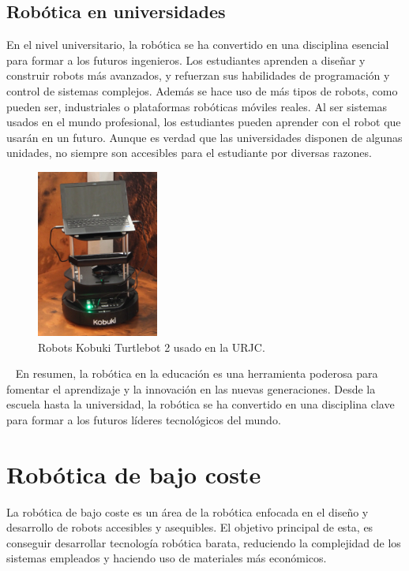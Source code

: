 \subsection{Robótica en universidades}
En el nivel universitario, la robótica se ha convertido en una disciplina esencial para formar a los futuros ingenieros. Los estudiantes aprenden 
a diseñar y construir robots más avanzados, y refuerzan sus habilidades de programación y control de sistemas complejos. Además se hace uso de más tipos 
de robots, como pueden ser, industriales o plataformas robóticas móviles reales. Al ser sistemas usados en el mundo profesional, los estudiantes pueden 
aprender con el robot que usarán en un futuro. Aunque es verdad que las universidades disponen de algunas unidades, no siempre son accesibles para el 
estudiante por diversas razones.
\begin{figure} [h!]
  \begin{center}
    \includegraphics[width=4cm]{figs/turtlebot.jpg}
  \end{center}
  \caption{Robots Kobuki Turtlebot 2 usado en la URJC.}
  \label{fig:robUniversidad}
\end{figure}\
\newpage
En resumen, la robótica en la educación es una herramienta poderosa para fomentar el aprendizaje y la innovación en las nuevas 
generaciones. Desde la escuela hasta la universidad, la robótica se ha convertido en una disciplina clave para formar a los futuros 
líderes tecnológicos del mundo.

\section{Robótica de bajo coste}
\label{sec:segundaseccion}
La robótica de bajo coste es un área de la robótica enfocada en el diseño y desarrollo de robots 
accesibles y asequibles. El objetivo principal de esta, es conseguir desarrollar tecnología robótica
barata, reduciendo la complejidad de los sistemas empleados y haciendo uso de materiales más económicos.

